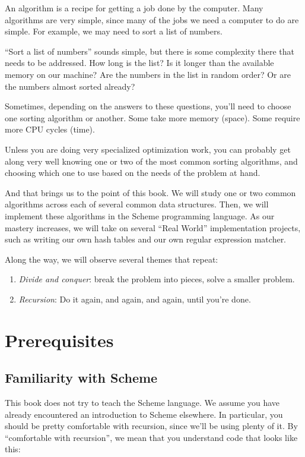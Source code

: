 \documentclass[12pt,openright,draft]{book}
\begin{document}
An algorithm is a recipe for getting a job done by the computer.
Many algorithms are very simple, since many of the jobs we need a
computer to do are simple.  For example, we may need to sort a list
of numbers.

``Sort a list of numbers'' sounds simple, but there is some complexity
there that needs to be addressed.  How long is the list?  Is it
longer than the available memory on our machine?  Are the numbers in
the list in random order?  Or are the numbers almost sorted already?

Sometimes, depending on the answers to these questions, you'll need
to choose one sorting algorithm or another.  Some take more memory
(space).  Some require more CPU cycles (time).

Unless you are doing very specialized optimization work, you can
probably get along very well knowing one or two of the most common
sorting algorithms, and choosing which one to use based on the needs
of the problem at hand.

And that brings us to the point of this book.  We will study one or
two common algorithms across each of several common data structures.
Then, we will implement these algorithms in the Scheme programming
language.  As our mastery increases, we will take on several ``Real
World'' implementation projects, such as writing our own hash tables
and our own regular expression matcher.

Along the way, we will observe several themes that repeat:

\begin{enumerate}
\item \emph{Divide and conquer}: break the problem into pieces, solve a smaller problem.
\item \emph{Recursion}: Do it again, and again, and again, until you're done.
\end{enumerate}

\chapter{Prerequisites}

\section{Familiarity with Scheme}

This book does not try to teach the Scheme language.  We assume you
have already encountered an introduction to Scheme elsewhere. In
particular, you should be pretty comfortable with recursion, since
we'll be using plenty of it.  By ``comfortable with recursion'', we mean
that you understand code that looks like this:
\end{document}
